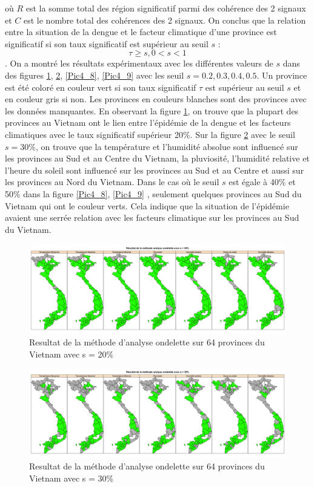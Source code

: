 où $R$ est la somme total des région significatif parmi des cohérence des 2 signaux et $C$ est le nombre total des cohérences des 2 signaux. On conclus que la relation entre la situation de la dengue et le facteur climatique d'une province est significatif si son taux significatif est supérieur au seuil $s$ : 
$$\tau \geq s, 0 < s < 1$$.
On a montré les résultats expérimentaux avec les différentes valeurs de $s$ dans des figures \ref{Pic4_6}, \ref{Pic4_7}, \ref{Pic4_8}, \ref{Pic4_9} avec les seuil $s =  0.2, 0.3, 0.4, 0.5$. Un province est été coloré en couleur vert si son taux significatif $\tau$ est supérieur au seuil $s$ et en couleur gris si non. Les provinces en couleurs blanches sont des provinces avec les données manquantes. En observant la figure \ref{Pic4_6}, on trouve que la plupart des provinces au Vietnam ont le lien entre l'épidémie de la dengue et les facteurs climatiques avec le taux significatif supérieur 20\%. Sur la figure  \ref{Pic4_7} avec le seuil $s = 30\%$, on trouve que la température et l'humidité absolue sont influencé sur les provinces au Sud et au Centre du Vietnam, la pluviosité, l'humidité relative et l'heure du soleil sont influencé sur les provinces au Sud et au Centre et aussi sur les provinces au Nord du Vietnam. Dans le cas où le seuil $s$ est égale à 40\% et 50\% dans la figure \ref{Pic4_8}, \ref{Pic4_9}  , seulement quelques provinces au Sud du Vietnam qui ont le couleur verts. Cela indique que la situation de l'épidémie avaient une serrée relation avec les facteurs climatique sur les provinces au Sud du Vietnam. 


\begin{figure}[h]
\includegraphics[width = \linewidth]{../figures/chap4/Pic4_6.png}
\caption{Resultat de la méthode d'analyse ondelette sur 64 provinces du Vietnam avec s = 20\%}
\label{Pic4_6}	
\end{figure}

\begin{figure}[h]
\includegraphics[width = \linewidth]{../figures/chap4/Pic4_7.png}
\caption{Resultat de la méthode d'analyse ondelette sur 64 provinces du Vietnam avec s = 30\%}
\label{Pic4_7}	
\end{figure}

